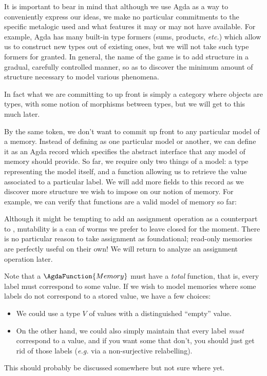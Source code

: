 \documentclass{jfp}
\begin{document}
It is important to bear in mind that although we use Agda as a way to
conveniently express our ideas, we make no particular commitments to
the specific metalogic used and what features it may or may not have
available.  For example, Agda has many built-in type formers (sums,
products, \emph{etc.}) which allow us to construct new types out of
existing ones, but we will not take such type formers for granted.  In
general, the name of the game is to add structure in a gradual,
carefully controlled manner, so as to discover the minimum amount of
structure necessary to model various phenomena.

\begin{commentary}
  In fact what we are committing to up front is simply a category
  where objects are types, with some notion of morphisms between
  types, but we will get to this much later.
\end{commentary}

By the same token, we don't want to commit up front to any particular
model of a memory.  Instead of defining  as one
particular model or another, we can define it as an Agda record which
specifies the abstract interface that any model of memory should
provide.  So far, we require only two things of a model: a type
 representing the model itself, and a function
 allowing us to retrieve the value associated to a
particular label.  We will add more fields to this record as we
discover more structure we wish to impose on our notion of memory.
%
%
For example, we can verify that functions are a valid model of memory
so far:
%

Although it might be tempting to add an assignment operation as a
counterpart to , mutability is a can of worms we
prefer to leave closed for the moment.  There is no particular reason
to take assignment as foundational; read-only memories are perfectly
useful on their own!  We will return to analyze an assignment
operation later.

\begin{commentary}
  Note that a $\AgdaFunction{Memory}$ must have a \emph{total}
   function, that is, every label must correspond to
  some value.  If we wish to model memories where some labels do not
  correspond to a stored value, we have a few choices:
  \begin{itemize}
  \item We could use a type $V$ of values with a distinguished
    ``empty'' value.
  \item On the other hand, we could also simply maintain that every
    label \emph{must} correspond to a value, and if you want some that
    don't, you should just get rid of those labels (\emph{e.g.} via a
    non-surjective relabelling).
  \end{itemize}
  This should probably be discussed somewhere but not sure where yet.
\end{commentary}
\end{document}
